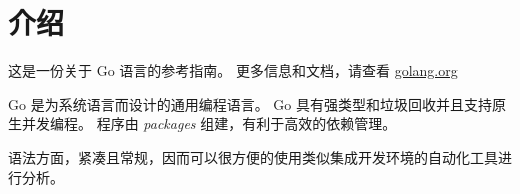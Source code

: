 
\chapter{介绍}
这是一份关于 Go 语言的参考指南。
更多信息和文档，请查看 \href{www.golang.org}{golang.org}

Go 是为系统语言而设计的通用编程语言。
Go 具有强类型和垃圾回收并且支持原生并发编程。
程序由 \emph{packages} 组建，有利于高效的依赖管理。

语法方面，紧凑且常规，因而可以很方便的使用类似集成开发环境的自动化工具进行分析。